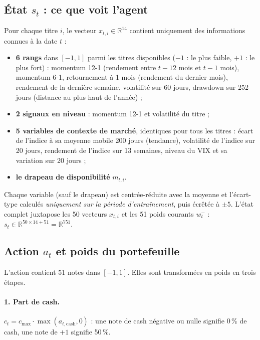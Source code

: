 \documentclass[11pt,a4paper]{article}
\newcommand{\R}{\mathbb{R}}
\begin{document}
\subsection{État \(s_t\) : ce que voit l'agent}\label{sec:etat}
Pour chaque titre \(i\), le vecteur \(x_{t,i}\in\R^{14}\) contient uniquement des informations connues à la date
\(t\) :
\begin{itemize}
  \item \textbf{6 rangs} dans \([-1,1]\) parmi les titres disponibles (\(-1\) : le plus faible, \(+1\) : le plus
        fort) : momentum 12-1 (rendement entre \(t-12\) mois et \(t-1\) mois), momentum 6-1, retournement à 1 mois
        (rendement du dernier mois), rendement de la dernière semaine, volatilité sur 60 jours, drawdown sur
        252 jours (distance au plus haut de l'année) ;
  \item \textbf{2 signaux en niveau} : momentum 12-1 et volatilité du titre ;
  \item \textbf{5 variables de contexte de marché}, identiques pour tous les titres : écart de l'indice à sa
        moyenne mobile 200 jours (tendance), volatilité de l'indice sur 20 jours, rendement de l'indice sur
        13 semaines, niveau du VIX et sa variation sur 20 jours ;
  \item \textbf{le drapeau de disponibilité} \(m_{t,i}\).
\end{itemize}
Chaque variable (sauf le drapeau) est centrée-réduite avec la moyenne et l'écart-type calculés
\emph{uniquement sur la période d'entraînement}, puis écrêtée à \(\pm5\). L'état complet juxtapose les 50 vecteurs
\(x_{t,i}\) et les 51 poids courants \(w^{-}_{t}\) : \(s_t\in\R^{50\times14+51}=\R^{751}\).

\subsection{Action \(a_t\) et poids du portefeuille}\label{sec:action}
L'action contient 51 notes dans \([-1,1]\). Elles sont transformées en poids en trois étapes.

\paragraph{1. Part de cash.} \(c_t=c_{\max}\cdot\max(a_{t,\text{cash}},0)\) : une note de cash négative ou nulle
signifie 0\,\% de cash, une note de \(+1\) signifie 50\,\%.
\end{document}
